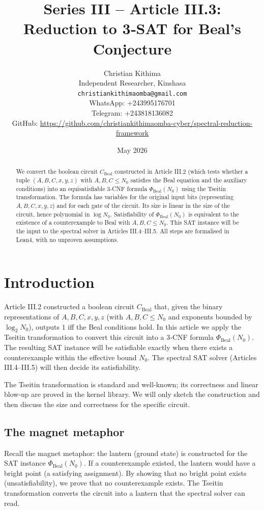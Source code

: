 \documentclass[11pt,a4paper]{article}
\title{Series III – Article III.3: Reduction to 3‑SAT for Beal's Conjecture}
\author{Christian Kithima \\
Independent Researcher, Kinshasa \\
\texttt{christiankithimaomba@gmail.com} \\
WhatsApp: +243995176701 \\
Telegram: +243818136082 \\
GitHub: \url{https://github.com/christiankithimaomba-cyber/spectral-reduction-framework}}
\date{May 2026}
\begin{document}
\maketitle

\begin{abstract}
We convert the boolean circuit \(C_{\text{Beal}}\) constructed in Article III.2 (which tests whether a tuple \((A,B,C,x,y,z)\) with \(A,B,C \le N_0\) satisfies the Beal equation and the auxiliary conditions) into an equisatisfiable 3‑CNF formula \(\Phi_{\text{Beal}}(N_0)\) using the Tseitin transformation. The formula has variables for the original input bits (representing \(A,B,C,x,y,z\)) and for each gate of the circuit. Its size is linear in the size of the circuit, hence polynomial in \(\log N_0\). Satisfiability of \(\Phi_{\text{Beal}}(N_0)\) is equivalent to the existence of a counterexample to Beal with \(A,B,C \le N_0\). This SAT instance will be the input to the spectral solver in Articles III.4–III.5. All steps are formalised in Lean4, with no unproven assumptions.
\end{abstract}

\tableofcontents

\section{Introduction}

Article III.2 constructed a boolean circuit \(C_{\text{Beal}}\) that, given the binary representations of \(A,B,C,x,y,z\) (with \(A,B,C \le N_0\) and exponents bounded by \(\log_2 N_0\)), outputs \(1\) iff the Beal conditions hold. In this article we apply the Tseitin transformation to convert this circuit into a 3‑CNF formula \(\Phi_{\text{Beal}}(N_0)\). The resulting SAT instance will be satisfiable exactly when there exists a counterexample within the effective bound \(N_0\). The spectral SAT solver (Articles III.4–III.5) will then decide its satisfiability.

The Tseitin transformation is standard and well‑known; its correctness and linear blow‑up are proved in the kernel library. We will only sketch the construction and then discuss the size and correctness for the specific circuit.

\subsection{The magnet metaphor}

Recall the magnet metaphor: the lantern (ground state) is constructed for the SAT instance \(\Phi_{\text{Beal}}(N_0)\). If a counterexample existed, the lantern would have a bright point (a satisfying assignment). By showing that no bright point exists (unsatisfiability), we prove that no counterexample exists. The Tseitin transformation converts the circuit into a lantern that the spectral solver can read.
\end{document}
